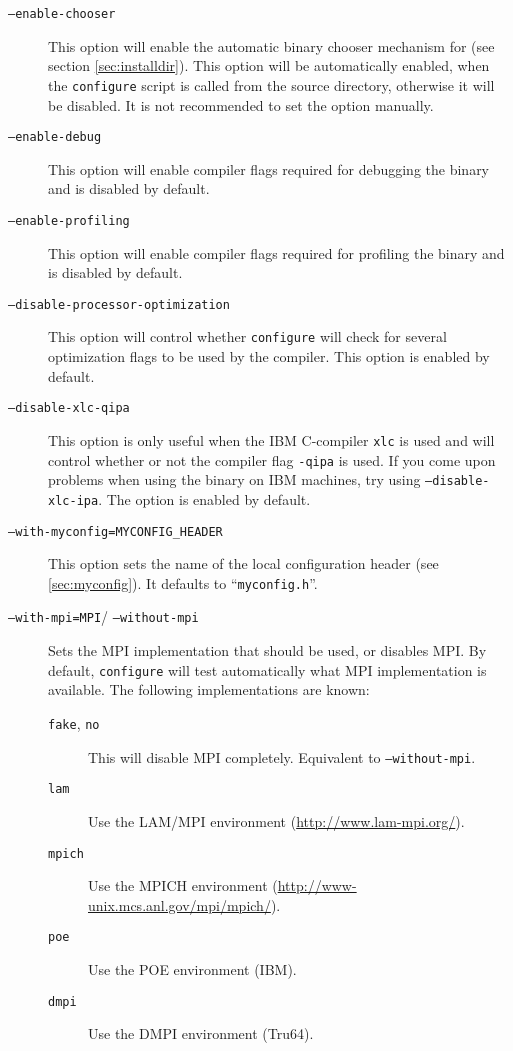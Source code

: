 \begin{description}
\item [\texttt{--enable-chooser}] This option will enable the
  automatic binary chooser mechanism for \es (see section
  \vref{sec:installdir}).  This option will be automatically enabled,
  when the \texttt{configure} script is called from the source
  directory, otherwise it will be disabled. It is not recommended to
  set the option manually.
\item[\texttt{--enable-debug}] This option will enable compiler flags
  required for debugging the \es binary and is disabled by default.
\item[\texttt{--enable-profiling}] This option will enable compiler
  flags required for profiling the \es binary and is disabled by
  default.
\item[\texttt{--disable-processor-optimization}] This option will
  control whether \texttt{configure} will check for several
  optimization flags to be used by the compiler. This option is
  enabled by default.
\item[\texttt{--disable-xlc-qipa}] This option is only useful when the
  IBM C-compiler \texttt{xlc} is used and will control whether or not
  the compiler flag \texttt{-qipa} is used.  If you come upon problems
  when using the \es binary on IBM machines, try using
  \texttt{--disable-xlc-ipa}. The option is enabled by default.
\item[\texttt{--with-myconfig=MYCONFIG\_HEADER}] This option sets the
  name of the local configuration header (see \vref{sec:myconfig}). It
  defaults to ``\texttt{myconfig.h}''.
\item[\texttt{--with-mpi=MPI}/ \texttt{--without-mpi}] Sets the MPI
  implementation that should be used, or disables MPI. By default,
  \texttt{configure} will test automatically what MPI implementation
  is available. The following implementations are known:
  \begin{description}
  \item[\texttt{fake}, \texttt{no}] This will disable MPI
    completely. Equivalent to \mbox{\texttt{--without-mpi}}.
  \item[\texttt{lam}] Use the LAM/MPI environment
    (\url{http://www.lam-mpi.org/}).
  \item[\texttt{mpich}] Use the MPICH environment
    (\url{http://www-unix.mcs.anl.gov/mpi/mpich/}).
  \item[\texttt{poe}] Use the POE environment (IBM).
  \item[\texttt{dmpi}] Use the DMPI environment (Tru64).

\end{description}
\end{description}
